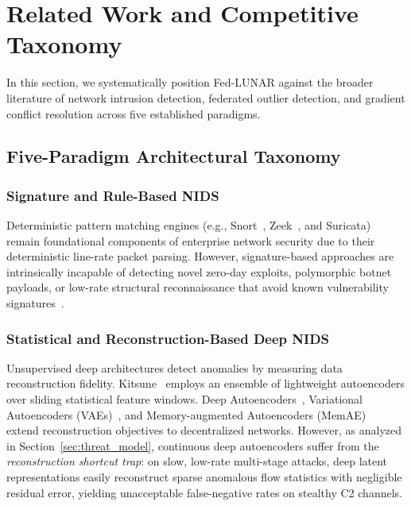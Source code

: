 
\section{Related Work and Competitive Taxonomy}
\label{sec:related}

In this section, we systematically position Fed-LUNAR against the broader literature of network intrusion detection, federated outlier detection, and gradient conflict resolution across five established paradigms.

\subsection{Five-Paradigm Architectural Taxonomy}
\label{subsec:taxonomy}

\subsubsection{Signature and Rule-Based NIDS}
Deterministic pattern matching engines (e.g., Snort~\cite{roesch1999snort}, Zeek~\cite{paxson1999bro}, and Suricata) remain foundational components of enterprise network security due to their deterministic line-rate packet parsing. However, signature-based approaches are intrinsically incapable of detecting novel zero-day exploits, polymorphic botnet payloads, or low-rate structural reconnaissance that avoid known vulnerability signatures~\cite{sommer2010outside}.

\subsubsection{Statistical and Reconstruction-Based Deep NIDS}
Unsupervised deep architectures detect anomalies by measuring data reconstruction fidelity. Kitsune~\cite{mirsky2018kitsune} employs an ensemble of lightweight autoencoders over sliding statistical feature windows. Deep Autoencoders~\cite{sakurada2014anomaly}, Variational Autoencoders (VAEs)~\cite{kingma2013auto}, and Memory-augmented Autoencoders (MemAE)~\cite{gong2019memorizing} extend reconstruction objectives to decentralized networks. However, as analyzed in Section~\ref{sec:threat_model}, continuous deep autoencoders suffer from the \emph{reconstruction shortcut trap}: on slow, low-rate multi-stage attacks, deep latent representations easily reconstruct sparse anomalous flow statistics with negligible residual error, yielding unacceptable false-negative rates on stealthy C2 channels.

